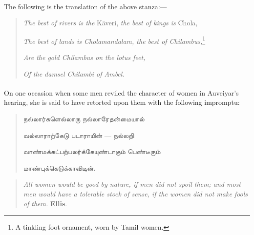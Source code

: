 \documentclass{article}
\newcommand{\TamilText}[1]{\texttamil{#1}}
\newcommand{\tam}[1]{\TamilText{#1}}
\begin{document}
\paragraph{}
The following is the translation of the above stanza:---
\begin{quotation}\small
\emph{The best of rivers is the} K\={a}veri, \emph{the best of kings is} Chola,

\emph{The best of lands is Cholamandalam, the best of Chilambus,}\footnote{A tinkling foot ornament, worn by Tamil women.}

\emph{Are the gold Chilambus on the lotus feet,}

\emph{Of the damsel Chilambi of Ambel.}
\end{quotation}
\paragraph{}
On one occasion when some men reviled the character of women in Auveiyar's hearing, she is said to have retorted upon them with the following impromptu:
\begin{quotation}\small
\tam{நல்லார்களெல்லாரு நல்லாரேதன்மையால்‌}

\tam{வல்லாராற்கேடு படாராயின்‌} --- \tam{நல்லறி}

\tam{வாண்மக்கட்பற்பலர்க்கேயுண்டாகும்‌ பெண்டீரும்‌}

\tam{மாண்புக்கெடுக்காவிடின்‌}.
\end{quotation}
\begin{quotation}\small
\emph{All women would be good by nature, if men did not spoil them; and most men would have a tolerable stock of sense, if the women did 
not make fools of them.} \textbf{Ellis}.
\end{quotation}
\end{document}
